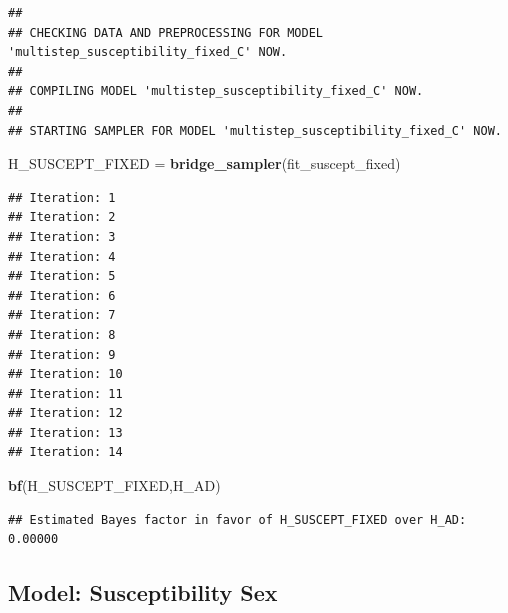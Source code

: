 \documentclass[
]{article}
\newenvironment{Shaded}{\begin{snugshade}}{\end{snugshade}}
\newcommand{\KeywordTok}[1]{\textcolor[rgb]{0.13,0.29,0.53}{\textbf{#1}}}
\newcommand{\NormalTok}[1]{#1}
\newcommand{\StringTok}[1]{\textcolor[rgb]{0.31,0.60,0.02}{#1}}
\begin{document}
\begin{verbatim}
## 
## CHECKING DATA AND PREPROCESSING FOR MODEL 'multistep_susceptibility_fixed_C' NOW.
## 
## COMPILING MODEL 'multistep_susceptibility_fixed_C' NOW.
## 
## STARTING SAMPLER FOR MODEL 'multistep_susceptibility_fixed_C' NOW.
\end{verbatim}

\begin{Shaded}
\begin{Highlighting}[]
\NormalTok{H_SUSCEPT_FIXED =}\StringTok{ }\KeywordTok{bridge_sampler}\NormalTok{(fit_suscept_fixed)}
\end{Highlighting}
\end{Shaded}

\begin{verbatim}
## Iteration: 1
## Iteration: 2
## Iteration: 3
## Iteration: 4
## Iteration: 5
## Iteration: 6
## Iteration: 7
## Iteration: 8
## Iteration: 9
## Iteration: 10
## Iteration: 11
## Iteration: 12
## Iteration: 13
## Iteration: 14
\end{verbatim}

\begin{Shaded}
\begin{Highlighting}[]
\KeywordTok{bf}\NormalTok{(H_SUSCEPT_FIXED,H_AD)}
\end{Highlighting}
\end{Shaded}

\begin{verbatim}
## Estimated Bayes factor in favor of H_SUSCEPT_FIXED over H_AD: 0.00000
\end{verbatim}

\hypertarget{model-susceptibility-sex}{%
\subsection{Model: Susceptibility Sex}\label{model-susceptibility-sex}}
\end{document}
